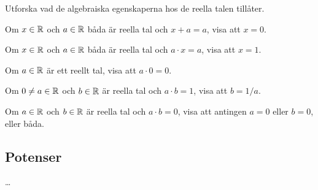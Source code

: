 \begin{exercise}
  Utforska vad de algebraiska egenskaperna hos de reella talen tillåter.
\end{exercise}
\begin{exercise}
  Om \(x\in\mathbb{R}\) och \(a\in\mathbb{R}\) båda är reella tal och \(x + a = a\),
  visa att \(x=0\).
\end{exercise}
\begin{exercise}
  Om \(x\in\mathbb{R}\) och \(a\in\mathbb{R}\) båda är reella tal och \(a \cdot x = a\),
  visa att \(x=1\).
\end{exercise}
\begin{exercise}
  Om \(a\in\mathbb{R}\) är ett reellt tal, visa att \(a \cdot 0 = 0\).
\end{exercise}
\begin{exercise}
  Om \(0 \neq a \in \mathbb{R}\) och \(b\in\mathbb{R}\) är reella tal och \(a \cdot b = 1\),
  visa att \(b = 1/a\).
\end{exercise}
\begin{exercise}
  Om \(a\in\mathbb{R}\) och \(b\in\mathbb{R}\) är reella tal och \(a \cdot b = 0\),
  visa att antingen \(a=0\) eller \(b=0\), eller båda.
\end{exercise}


\subsection{Potenser}
\dots

